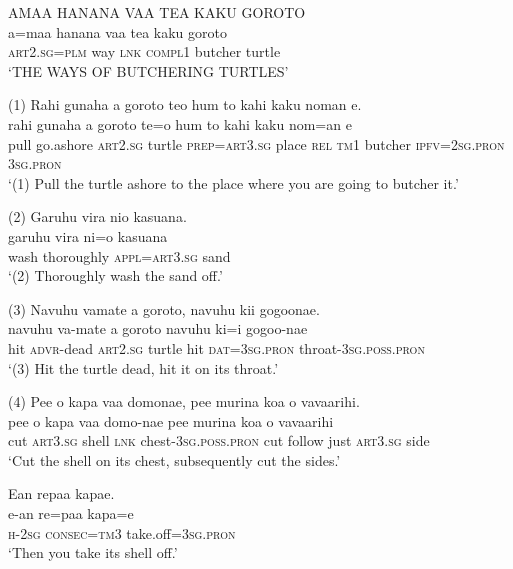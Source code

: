 \ea\label{ex:text19-36}
AMAA HANANA VAA TEA KAKU GOROTO\\
\gll a=maa	hanana	vaa	tea	kaku	goroto\\
     \textsc{art}2.\textsc{sg}=\textsc{plm}	way	\textsc{lnk}	\textsc{compl}1	butcher	turtle\\
\glt `THE WAYS OF BUTCHERING TURTLES'
\z

\ea\label{ex:text19-37}
(1) Rahi gunaha a goroto teo hum to kahi kaku noman e.\\
\gll rahi	gunaha	a	goroto	te=o	hum	to	kahi	kaku	nom=an	e\\
     pull	go.ashore	\textsc{art}2.\textsc{sg}	turtle	\textsc{prep}=\textsc{art}3.\textsc{sg}	place	\textsc{rel}	\textsc{tm}1	butcher	\textsc{ipfv}=2\textsc{sg}.\textsc{pron}	3\textsc{sg}.\textsc{pron}\\
\glt `(1) Pull the turtle ashore to the place where you are going to butcher it.'
\z

\ea\label{ex:text19-38}
(2) Garuhu vira nio kasuana.\\
\gll garuhu	vira	ni=o	kasuana\\
     wash	thoroughly	\textsc{appl}=\textsc{art}3.\textsc{sg}	sand\\
\glt `(2) Thoroughly wash the sand off.'
\z

\ea\label{ex:text19-39}
(3) Navuhu vamate a goroto, navuhu kii gogoonae.\\
\gll navuhu	va-mate	a	goroto	navuhu	ki=i	gogoo-nae\\
     hit	\textsc{advr}-dead	\textsc{art}2.\textsc{sg}	turtle	hit	\textsc{dat}=3\textsc{sg}.\textsc{pron}	throat-3\textsc{sg}.\textsc{poss}.\textsc{pron}\\
\glt `(3) Hit the turtle dead, hit it on its throat.'
\z

\ea\label{ex:text19-40}
(4) Pee o kapa vaa domonae, pee murina koa o vavaarihi.\\
\gll pee	o	kapa	vaa	domo-nae	pee	murina	koa	o	vavaarihi\\
     cut	\textsc{art}3.\textsc{sg}	shell	\textsc{lnk}	chest-3\textsc{sg}.\textsc{poss}.\textsc{pron}	cut	follow	just	\textsc{art}3.\textsc{sg}	side\\
\glt `Cut the shell on its chest, subsequently cut the sides.'
\z

\ea\label{ex:text19-41}
Ean repaa kapae.\\
\gll e-an	re=paa	kapa=e\\
     \textsc{h}-2\textsc{sg}	\textsc{consec}=\textsc{tm}3	take.off=3\textsc{sg}.\textsc{pron}\\
\glt `Then you take its shell off.'
\z

